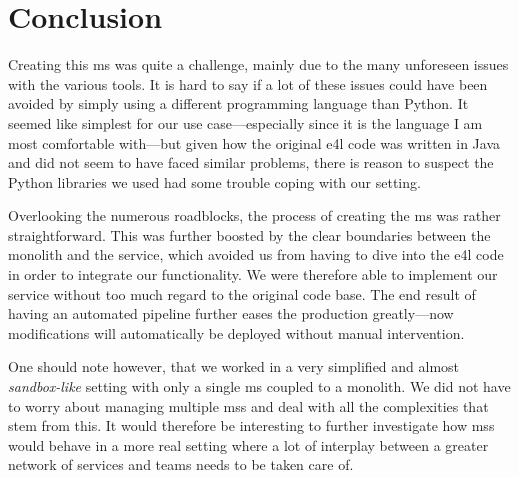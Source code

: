 \section{Conclusion}

Creating this \gls{ms} was quite a challenge, mainly due to the many
unforeseen issues with the various tools. It is hard to say if a lot
of these issues could have been avoided by simply using a different
programming language than Python. It seemed like simplest for our use
case---especially since it is the language I am most comfortable
with---but given how the original \gls{e4l} code was written in Java
and did not seem to have faced similar problems, there is reason to
suspect the Python libraries we used had some trouble coping with our
setting.

Overlooking the numerous roadblocks, the process of creating the
\gls{ms} was rather straightforward. This was further boosted by the
clear boundaries between the monolith and the service, which avoided
us from having to dive into the \gls{e4l} code in order to integrate
our functionality. We were therefore able to implement our service
without too much regard to the original code base. The end result of
having an automated pipeline further eases the production greatly---now
modifications will automatically be deployed without manual
intervention.

One should note however, that we worked in a very simplified and
almost \emph{sandbox-like} setting with only a single \gls{ms} coupled to
a monolith. We did not have to worry about managing multiple
\glspl{ms} and deal with all the complexities that stem from this. It
would therefore be interesting to further investigate how \glspl{ms} would
behave in a more real setting where a lot of interplay between a
greater network of services and teams needs to be taken care of.

